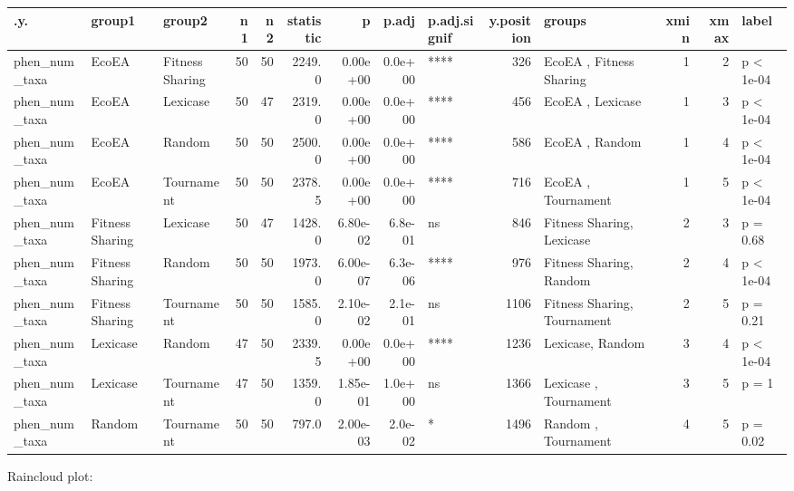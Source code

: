 \documentclass[]{book}
\begin{document}
\begin{table}
\centering
\begin{tabular}[t]{l|l|l|r|r|r|r|r|l|r|l|r|r|l}
\hline
.y. & group1 & group2 & n1 & n2 & statistic & p & p.adj & p.adj.signif & y.position & groups & xmin & xmax & label\\
\hline
phen\_num\_taxa & EcoEA & Fitness Sharing & 50 & 50 & 2249.0 & 0.00e+00 & 0.0e+00 & **** & 326 & EcoEA          , Fitness Sharing & 1 & 2 & p < 1e-04\\
\hline
phen\_num\_taxa & EcoEA & Lexicase & 50 & 47 & 2319.0 & 0.00e+00 & 0.0e+00 & **** & 456 & EcoEA   , Lexicase & 1 & 3 & p < 1e-04\\
\hline
phen\_num\_taxa & EcoEA & Random & 50 & 50 & 2500.0 & 0.00e+00 & 0.0e+00 & **** & 586 & EcoEA , Random & 1 & 4 & p < 1e-04\\
\hline
phen\_num\_taxa & EcoEA & Tournament & 50 & 50 & 2378.5 & 0.00e+00 & 0.0e+00 & **** & 716 & EcoEA     , Tournament & 1 & 5 & p < 1e-04\\
\hline
phen\_num\_taxa & Fitness Sharing & Lexicase & 50 & 47 & 1428.0 & 6.80e-02 & 6.8e-01 & ns & 846 & Fitness Sharing, Lexicase & 2 & 3 & p = 0.68\\
\hline
phen\_num\_taxa & Fitness Sharing & Random & 50 & 50 & 1973.0 & 6.00e-07 & 6.3e-06 & **** & 976 & Fitness Sharing, Random & 2 & 4 & p < 1e-04\\
\hline
phen\_num\_taxa & Fitness Sharing & Tournament & 50 & 50 & 1585.0 & 2.10e-02 & 2.1e-01 & ns & 1106 & Fitness Sharing, Tournament & 2 & 5 & p = 0.21\\
\hline
phen\_num\_taxa & Lexicase & Random & 47 & 50 & 2339.5 & 0.00e+00 & 0.0e+00 & **** & 1236 & Lexicase, Random & 3 & 4 & p < 1e-04\\
\hline
phen\_num\_taxa & Lexicase & Tournament & 47 & 50 & 1359.0 & 1.85e-01 & 1.0e+00 & ns & 1366 & Lexicase  , Tournament & 3 & 5 & p = 1\\
\hline
phen\_num\_taxa & Random & Tournament & 50 & 50 & 797.0 & 2.00e-03 & 2.0e-02 & * & 1496 & Random    , Tournament & 4 & 5 & p = 0.02\\
\hline
\end{tabular}
\end{table}

Raincloud plot:
\end{document}
